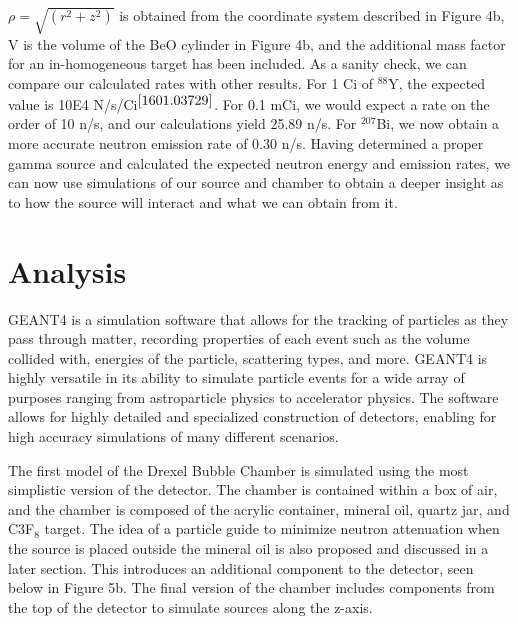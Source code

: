 \documentclass[%
12pt,
twoside,
reprint,
amsmath,amssymb,
aps,
]{article}
\begin{document}
	\noindent $\rho = \sqrt{(r^{2} + z^{2})}$ is obtained from the coordinate system described in Figure 4b, V is the volume of the BeO cylinder in Figure 4b, and the additional mass factor for an in-homogeneous target has been included. As a sanity check, we can compare our calculated rates with other results. For 1 Ci of $^{88}$Y, the expected value is 10E4 N/s/Ci$^{\cite{1601.03729}}$. For 0.1 mCi, we would expect a rate on the order of 10 n/s, and our calculations yield 25.89 n/s. For $^{207}$Bi, we now obtain a more accurate neutron emission rate of 0.30 n/s. Having determined a proper gamma source and calculated the expected neutron energy and emission rates, we can now use simulations of our source and chamber to obtain a deeper insight as to how the source will interact and what we can obtain from it. 

	\section{Analysis}
	\par GEANT4 is a simulation software that allows for the tracking of particles as they pass through matter, recording properties of each event such as the volume collided with, energies of the particle, scattering types, and more. GEANT4 is highly versatile in its ability to simulate particle events for a wide array of purposes ranging from astroparticle physics to accelerator physics. The software allows for highly detailed and specialized construction of detectors, enabling for high accuracy simulations of many different scenarios.
	\par The first model of the Drexel Bubble Chamber is simulated using the most simplistic version of the detector. The chamber is contained within a box of air, and the chamber is composed of the acrylic container, mineral oil, quartz jar, and C${3}$F$_{8}$ target. The idea of a particle guide to minimize neutron attenuation when the source is placed outside the mineral oil is also proposed and discussed in a later section. This introduces an additional component to the detector, seen below in Figure 5b. The final version of the chamber includes components from the top of the detector to simulate sources along the z-axis.
	
\end{document}

